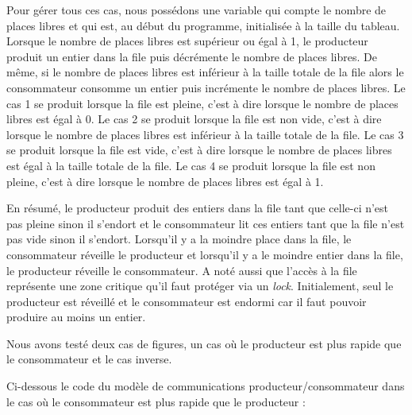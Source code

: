 \documentclass[a4paper,12pt]{report}
\begin{document}
Pour gérer tous ces cas, nous possédons une variable qui compte le nombre de places libres et qui est, au début du programme, initialisée à la taille du tableau. Lorsque le nombre de places libres est supérieur ou égal à 1, le producteur produit un entier dans la file puis décrémente le nombre de places libres. De même, si le nombre de places libres est inférieur à la taille totale de la file alors le consommateur consomme un entier puis incrémente le nombre de places libres.\newline
Le cas 1 se produit lorsque la file est pleine, c'est à dire lorsque le nombre de places libres est égal à 0. 
Le cas 2 se produit lorsque la file est non vide,  c'est à dire lorsque le nombre de places libres est inférieur à la taille totale de la file.
Le cas 3 se produit lorsque la file est vide,  c'est à dire lorsque le nombre de places libres est égal à la taille totale de la file.
Le cas 4 se produit lorsque la file est non pleine, c'est à dire lorsque le nombre de places libres est égal à 1.\newline

En résumé, le producteur produit des entiers dans la file tant que celle-ci n'est pas pleine sinon il s'endort et le consommateur lit ces entiers tant que la file n'est pas vide sinon il s'endort. Lorsqu'il y a la moindre place dans la file, le consommateur réveille le producteur et lorsqu'il y a le moindre entier dans la file, le producteur réveille le consommateur.
A noté aussi que l'accès à la file représente une zone critique qu'il faut protéger via un \textit{lock}.
Initialement, seul le producteur est réveillé et le consommateur est endormi car il faut pouvoir produire au moins un entier.\newline

Nous avons testé deux cas de figures, un cas où le producteur est plus rapide que le consommateur et le cas inverse.\newline

Ci-dessous le code du modèle de communications producteur/consommateur dans le cas où le consommateur est plus rapide que le producteur :
\end{document}
